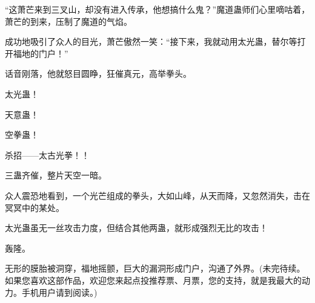 \begin{this_body}
“这萧芒来到三叉山，却没有进入传承，他想搞什么鬼？”魔道蛊师们心里嘀咕着，萧芒的到来，压制了魔道的气焰。

成功地吸引了众人的目光，萧芒傲然一笑：“接下来，我就动用太光蛊，替尔等打开福地的门户！”

话音刚落，他就怒目圆睁，狂催真元，高举拳头。

太光蛊！

天意蛊！

空拳蛊！

杀招——太古光拳！！

三蛊齐催，整片天空一暗。

众人震恐地看到，一个光芒组成的拳头，大如山峰，从天而降，又忽然消失，击在冥冥中的某处。

太光蛊虽无一丝攻击力度，但结合其他两蛊，就形成强烈无比的攻击！

轰隆。

无形的膜胎被洞穿，福地摇颤，巨大的漏洞形成门户，沟通了外界。(未完待续。如果您喜欢这部作品，欢迎您来起点投推荐票、月票，您的支持，就是我最大的动力。手机用户请到阅读。)

\end{this_body}

